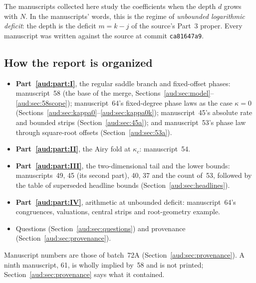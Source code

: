 \documentclass[11pt,a4paper]{article}
\numberwithin{equation}{section}
\begin{document}
The manuscripts collected here study the coefficients when the depth $d$ grows with $N$. In the manuscripts' words, this is the regime of \emph{unbounded logarithmic deficit}: the depth is the deficit $m=k-j$ of the source's Part~3 proper. Every manuscript was written against the source at commit \texttt{ca81647a9}.

\subsection{How the report is organized}\label{aud:sec:organization}
\begin{itemize}
\item \textbf{Part~\ref{aud:part:I}}, the regular saddle branch and fixed-offset phases: manuscript~58 (the base of the merge, Sections~\ref{aud:sec:model}--\ref{aud:sec:58scope}); manuscript~64's fixed-degree phase laws as the case $\kappa=0$ (Sections~\ref{aud:sec:kappa0}--\ref{aud:sec:kappa0k}); manuscript~45's absolute rate and bounded strips (Section~\ref{aud:sec:45a}); and manuscript~53's phase law through square-root offsets (Section~\ref{aud:sec:53a}).
\item \textbf{Part~\ref{aud:part:II}}, the Airy fold at $\kappa_c$: manuscript~54.
\item \textbf{Part~\ref{aud:part:III}}, the two-dimensional tail and the lower bounds: manuscripts~49, 45 (its second part), 40, 37 and the count of~53, followed by the table of superseded headline bounds (Section~\ref{aud:sec:headlines}).
\item \textbf{Part~\ref{aud:part:IV}}, arithmetic at unbounded deficit: manuscript~64's congruences, valuations, central strips and root-geometry example.
\item Questions (Section~\ref{aud:sec:questions}) and provenance (Section~\ref{aud:sec:provenance}).
\end{itemize}
Manuscript numbers are those of batch~72A (Section~\ref{aud:sec:provenance}). A ninth manuscript, 61, is wholly implied by~58 and is not printed; Section~\ref{aud:sec:provenance} says what it contained.
\end{document}
